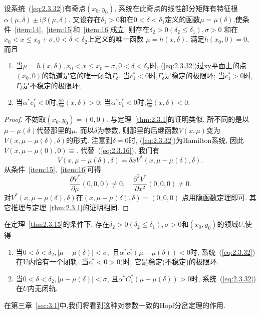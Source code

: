 \begin{theorem}
  \label{thm2.3.15}
  设系统~(\ref{eq:2.3.32})有奇点$(x_0,y_0)$,
  系统在此奇点的线性部分矩阵有特征根$\alpha(\mu, \delta) \pm \mathrm{i} \beta(\mu, \delta).$
  又设存在$\delta_1>0$和在$0<\delta<\delta_1$定义的函数$\mu=\mu(\delta)$,使条件~\ref{item:14},~\ref{item:15}和~\ref{item:16}成立.
  则存在$\delta_{2}>0\left(\delta_{2} \leqslant \delta_{1}\right), \sigma>0$
  和在
  $x_{0}<x \leqslant x_{0}+\sigma, 0<\delta<\delta_2$上定义的唯一函数
  $\mu=h(x,\delta)$,
  满足$h(x_0,0)=0,$
  而且
  \begin{enumerate}
  \item\label{item:18}
    当$\mu=h(x, \delta), x_{0}<x \leqslant x_{0}+\sigma, 0<\delta<\delta_{2}$时,
    (\ref{eq:2.3.32})过xy平面上的点$(x_{0},0)$的轨道是它的唯一闭轨$\Gamma_{\delta}$.
    当$c_1^{*}<0$时,$\Gamma_{\delta}$是稳定的极限环;
    当$c_{1}^{*}>0$时,$\Gamma_{\delta}$是不稳定的极限环;
  \item\label{item:19}
    当$\alpha^{*} c_{1}^{*}<0$时,$\frac{\partial h}{\partial x}(x, \delta)>0$;
    当$\alpha^{*} c_{1}^{*}<0$时,$\frac{\partial h}{\partial x}(x, \delta)<0$.
  \end{enumerate}
\end{theorem}

\begin{proof}
  不妨取$\left(x_{0}, y_{0}\right)=(0,0)$.
  与定理~\ref{thm:2.3.1}的证明类似,
  所不同的是以$\mu-\mu(\delta)$代替那里的$\mu$,
  而以$\delta$为参数,
  则那里的后继函数$V(x,\mu)$变为$V(x, \mu-\mu(\delta), \delta)$的形式.
  注意到$\delta=0$时,
  (\ref{eq:2.3.32})为Hamilton系统,
  因此$V(x, \mu-\mu(0), 0) \equiv $.
  代替~(\ref{eq:2.3.16}),
  我们有
  $$
V(x, \mu-\mu(\delta), \delta)=\delta x V^{*}(x, \mu-\mu(\delta), \delta).
$$
从条件~\ref{item:15},~\ref{item:16}可得
$$
\frac{\partial V^{*}}{\partial \mu}(0,0,0) \neq 0, \quad \frac{\partial^{2} V^{*}}{\partial x^{2}}(0,0,0) \neq 0.
$$
对$V^{*}(x, \mu-\mu(\delta), \delta)$在$(x, \mu-\mu(\delta), \delta)=(0,0,0)$
点用隐函数定理即可.
其它推理与定理~\ref{thm:2.3.1}的证明相同.
\end{proof}

\begin{collory}
  \label{col2.3.16}
  在定理~\ref{thm2.3.15}的条件下,
  存在$\delta_{2}>0\left(\delta_{2} \leqslant \delta_{1}\right), \sigma>0$和$(x_{0},y_{0})$的领域$U$,使得
  \begin{enumerate}
  \item\label{item:20}
    当$0<\delta<\delta_{2},|\mu-\mu(\delta)|<\sigma,$
    且$\alpha^{*} c_{1}^{*}(\mu-\mu(\delta))<0$时,
    系统~(\ref{eq:2.3.32})在U内恰有一个闭轨.
    当$c_{1}^{*}<0>0 )$时,
    它是稳定(不稳定)的极限环.
  \item\label{item:21}
    当$0<\delta<\delta_{2},|\mu-\mu(\delta)|<\sigma$,
    且$\alpha^{*} C_{1}^{*}(\mu-\mu(\delta))>0$时,
    系统~(\ref{eq:2.3.32})在$U$内无闭轨.
  \end{enumerate}
\end{collory}

在第三章~\ref{sec:3.1}中,我们将看到这种对参数一致的Hopf分岔定理的作用.
